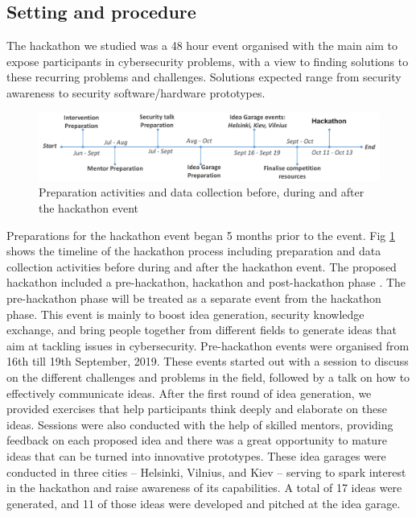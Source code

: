 \documentclass[runningheads]{llncs}
\begin{document}

\subsection{Setting and procedure}
The hackathon we studied was a 48 hour event organised with the main aim to expose participants in cybersecurity problems, with a view to finding solutions to these recurring problems and challenges. %
Solutions expected range from security awareness to security software/hardware prototypes. 
\begin{figure}[h]
  \centering
  \includegraphics[width=\linewidth]{timelinehack.pdf}
  \caption{Preparation activities and data collection before, during and after the hackathon event} \label{Fig:timeline} 
\end{figure}
Preparations for the hackathon event began 5 months prior to the event. Fig \ref{Fig:timeline} shows the timeline of the hackathon process including preparation and data collection activities before during and after the hackathon event. The proposed hackathon included a pre-hackathon, hackathon and post-hackathon phase \cite{komssi2014hackathons}. The pre-hackathon phase will be treated as a separate event from the hackathon phase. This event is mainly to boost idea generation, security knowledge exchange, and bring people together from different fields to generate ideas that aim at tackling issues in cybersecurity. Pre-hackathon events were organised from 16th till 19th September, 2019. These events started out with a session to discuss on the different challenges and problems in the field, followed by a talk on how to effectively communicate ideas. After the first round of idea generation, we provided exercises that help participants think deeply and elaborate on these ideas. Sessions were also conducted with the help of skilled mentors, providing feedback on each proposed idea and there was a great opportunity to mature ideas that can be turned into innovative prototypes. These idea garages were conducted in three cities -- Helsinki, Vilnius, and Kiev -- serving to spark interest in the hackathon and raise awareness of its capabilities. A total of 17 ideas were generated, and 11 of those ideas were developed and pitched at the idea garage. 
\end{document}
